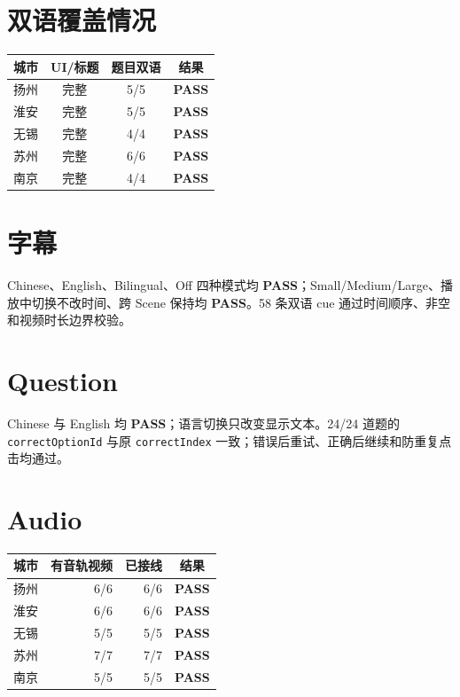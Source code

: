 \documentclass[UTF8,a4paper,11pt]{ctexart}
\newcommand{\status}[1]{\textcolor{jade}{\textbf{#1}}}
\newcommand{\code}[1]{\texttt{#1}}
\begin{document}
\section{双语覆盖情况}
\begin{center}
\begin{tabular}{lccc}
\toprule
城市 & UI/标题 & 题目双语 & 结果\\
\midrule
扬州 & 完整 & 5/5 & \status{PASS}\\
淮安 & 完整 & 5/5 & \status{PASS}\\
无锡 & 完整 & 4/4 & \status{PASS}\\
苏州 & 完整 & 6/6 & \status{PASS}\\
南京 & 完整 & 4/4 & \status{PASS}\\
\bottomrule
\end{tabular}
\end{center}

\section{字幕}
Chinese、English、Bilingual、Off 四种模式均 \status{PASS}；Small/Medium/Large、播放中切换不改时间、跨 Scene 保持均 \status{PASS}。58 条双语 cue 通过时间顺序、非空和视频时长边界校验。

\section{Question}
Chinese 与 English 均 \status{PASS}；语言切换只改变显示文本。24/24 道题的 \code{correctOptionId} 与原 \code{correctIndex} 一致；错误后重试、正确后继续和防重复点击均通过。

\section{Audio}
\begin{center}
\begin{tabular}{lrrc}
\toprule
城市 & 有音轨视频 & 已接线 & 结果\\
\midrule
扬州 & 6/6 & 6/6 & \status{PASS}\\
淮安 & 6/6 & 6/6 & \status{PASS}\\
无锡 & 5/5 & 5/5 & \status{PASS}\\
苏州 & 7/7 & 7/7 & \status{PASS}\\
南京 & 5/5 & 5/5 & \status{PASS}\\
\bottomrule
\end{tabular}
\end{center}
\end{document}

